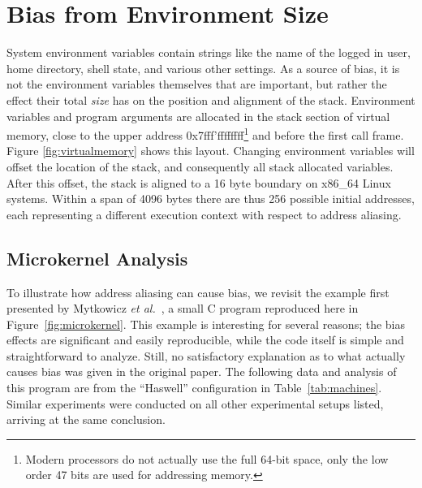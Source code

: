 \documentclass[10pt, conference, compsocconf]{IEEEtran}
\begin{document}
\section{Bias from Environment Size}
\label{sec:environment}
System environment variables contain strings like the name of the logged in user, home directory, shell state, and various other settings.
As a source of bias, it is not the environment variables themselves that are important, but rather the effect their total \emph{size} has on the position and alignment of the stack.
Environment variables and program arguments are allocated in the stack section of virtual memory, close to the upper address 0x7fff'ffffffff\footnote{Modern processors do not actually use the full 64-bit space, only the low order 47 bits are used for addressing memory.} and before the first call frame. Figure \ref{fig:virtualmemory} shows this layout.
Changing environment variables will offset the location of the stack, and consequently all stack allocated variables.
After this offset, the stack is aligned to a 16 byte boundary on x86_64 Linux systems.
Within a span of 4096 bytes there are thus 256 possible initial addresses, each representing a different execution context with respect to address aliasing.

\subsection{Microkernel Analysis}
\label{sec:microkernel}
To illustrate how address aliasing can cause bias, we revisit the example first presented by Mytkowicz \emph{et al.}~\cite{Mytkowicz:2009:WrongData}, a small C program reproduced here in Figure~\ref{fig:microkernel}.
This example is interesting for several reasons; the bias effects are significant and easily reproducible, while the code itself is simple and straightforward to analyze.
Still, no satisfactory explanation as to what actually causes bias was given in the original paper.
The following data and analysis of this program are from the ``Haswell'' configuration in Table~\ref{tab:machines}.
Similar experiments were conducted on all other experimental setups listed, arriving at the same conclusion.
\end{document}

